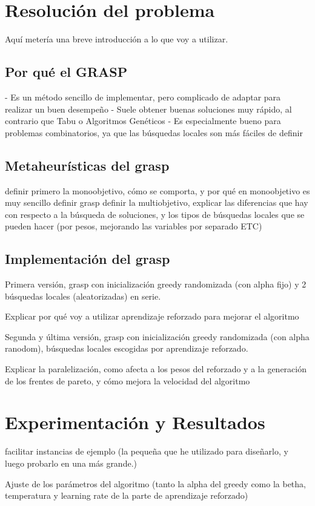 \documentclass[12pt,a4paper]{book}
\begin{document}
\chapter{Resolución del problema}
Aquí metería una breve introducción a lo que voy a utilizar.

\section{Por qué el GRASP}
- Es un método sencillo de implementar, pero complicado de adaptar para realizar un buen desempeño
- Suele obtener buenas soluciones muy rápido, al contrario que Tabu o Algoritmos Genéticos
- Es especialmente bueno para problemas combinatorios, ya que las búsquedas locales son más fáciles de definir

\section{Metaheurísticas del grasp}
definir primero la monoobjetivo, cómo se comporta, y por qué en monoobjetivo es muy sencillo definir grasp
definir la multiobjetivo, explicar las diferencias que hay con respecto a la búsqueda de soluciones, y los tipos de búsquedas locales que se pueden hacer (por pesos, mejorando las variables por separado ETC)

\section{Implementación del grasp}
Primera versión, grasp con inicialización greedy randomizada (con alpha fijo) y 2 búsquedas locales (aleatorizadas) en serie.

Explicar por qué voy a utilizar aprendizaje reforzado para mejorar el algoritmo

Segunda y última versión, grasp con inicialización greedy randomizada (con alpha ranodom), búsquedas locales escogidas por aprendizaje reforzado.

Explicar la paralelización, como afecta a los pesos del reforzado y a la generación de los frentes de pareto, y cómo mejora la velocidad del algoritmo

\chapter{Experimentación y Resultados}
facilitar instancias de ejemplo (la pequeña que he utilizado para diseñarlo, y luego probarlo en una más grande.)

Ajuste de los parámetros del algoritmo (tanto la alpha del greedy como la betha, temperatura y learning rate de la parte de aprendizaje reforzado)
\end{document}
